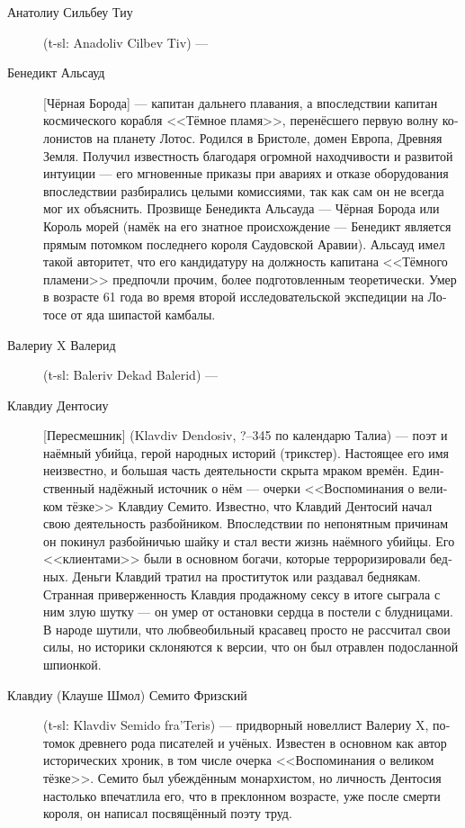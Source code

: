 \documentclass[a4paper,12pt,fleqn]{book}\usepackage{cooltooltips}\usepackage{polyglossia}\setdefaultlanguage[babelshorthands=true]{russian}\setotherlanguage{english}\defaultfontfeatures{Ligatures=TeX,Mapping=tex-text} \usepackage{xcolor}\definecolor{lightgray}{HTML}{bbbbbb}\color{lightgray}\newcommand{\ml}[3]{\textenglish{\textcolor{black}{#3}}}
\begin{document}
{\begin{description}
\item[Анатолиу Сильбеу Тиу] (t-sl: Anadoliv Cilbev Tiv) ---
\item[Бенедикт Альсауд] [Чёрная Борода] --- капитан дальнего плавания, а впоследствии капитан космического корабля <<Тёмное пламя>>, перенёсшего первую волну колонистов на планету Лотос.
Родился в Бристоле, домен Европа, Древняя Земля.
Получил известность благодаря огромной находчивости и развитой интуиции --- его мгновенные приказы при авариях и отказе оборудования впоследствии разбирались целыми комиссиями, так как сам он не всегда мог их объяснить.
Прозвище Бенедикта Альсауда --- Чёрная Борода или Король морей (намёк на его знатное происхождение --- Бенедикт является прямым потомком последнего короля Саудовской Аравии).
Альсауд имел такой авторитет, что его кандидатуру на должность капитана <<Тёмного пламени>> предпочли прочим, более подготовленным теоретически.
Умер в возрасте 61 года во время второй исследовательской экспедиции на Лотосе от яда шипастой камбалы.
\item[Валериу X Валерид] (t-sl: Baleriv Dekad Balerid) ---
\item[Клавдиу Дентосиу] [Пересмешник] (Klavdiv Dendosiv, ?--345 по календарю Талиа) --- поэт и наёмный убийца, герой народных историй (трикстер).
Настоящее его имя неизвестно, и большая часть деятельности скрыта мраком времён.
Единственный надёжный источник о нём --- очерки <<Воспоминания о великом тёзке>> Клавдиу Семито.
Известно, что Клавдий Дентосий начал свою деятельность разбойником.
Впоследствии по непонятным причинам он покинул разбойничью шайку и стал вести жизнь наёмного убийцы.
Его <<клиентами>> были в основном богачи, которые терроризировали бедных.
Деньги Клавдий тратил на проституток или раздавал беднякам.
Странная приверженность Клавдия продажному сексу в итоге сыграла с ним злую шутку --- он умер от остановки сердца в постели с блудницами.
В народе шутили, что любвеобильный красавец просто не рассчитал свои силы, но историки склоняются к версии, что он был отравлен подосланной шпионкой.
\item[Клавдиу (Клауше Шмол) Семито Фризский] (t-sl: Klavdiv Semido fra'Teris) --- придворный новеллист Валериу X, потомок древнего рода писателей и учёных.
Известен в основном как автор исторических хроник, в том числе очерка <<Воспоминания о великом тёзке>>.
Семито был убеждённым монархистом, но личность Дентосия настолько впечатлила его, что в преклонном возрасте, уже после смерти короля, он написал посвящённый поэту труд.

\end{description}}
\end{document}
